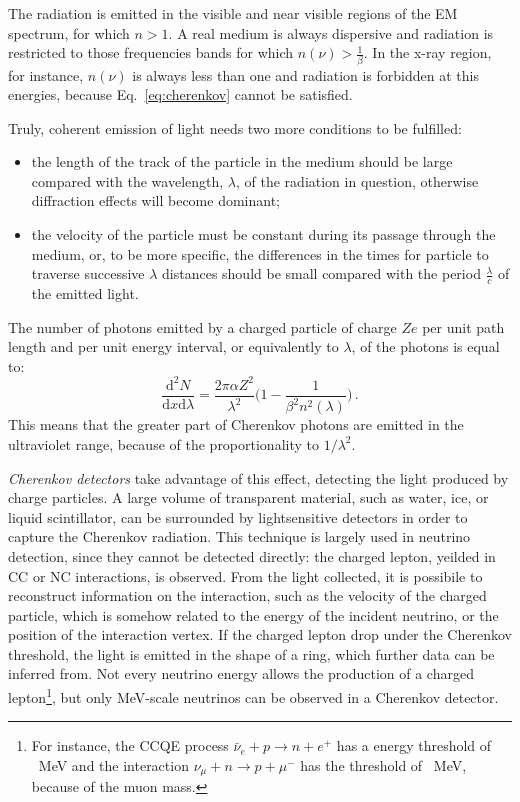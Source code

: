 The radiation is emitted in the visible and near visible regions of the EM spectrum, for which $ n > 1$.
A real medium is always dispersive and radiation is restricted to those frequencies bands for which %
$n(\nu) > \frac{1}{\beta}$.
In the x-ray region, for instance, $n(\nu)$ is always less than one and radiation is forbidden at this energies, %
because Eq.~\ref{eq:cherenkov} cannot be satisfied.

Truly, coherent emission of light needs two more conditions to be fulfilled:
\begin{itemize}
	\item the length of the track of the particle in the medium should be large compared with the wavelength, %
		$\lambda$, of the radiation in question, otherwise diffraction effects will become dominant;
	\item the velocity of the particle must be constant during its passage through the medium, or, %
		to be more specific, the differences in the times for particle to traverse successive $\lambda$ distances %
		should be small compared with the period $\frac{\lambda}{c}$ of the emitted light.
\end{itemize}

The number of photons emitted by a charged particle of charge $Ze$ per unit path length and per unit %
energy interval, or equivalently to $\lambda$, of the photons is equal to:
\begin{equation}
	\label{eq:ch_ph}
	\frac{\mathrm{d}^2N}{\mathrm{d}x\mathrm{d}\lambda} = \frac{2\pi\alpha Z^2}{\lambda^2} %
	\bigg(1-\frac{1}{\beta^2 n^2(\lambda)} \bigg)\,.
\end{equation}
This means that the greater part of Cherenkov photons are emitted in the ultraviolet range, because of the %
proportionality to $1/\lambda^2$.

\emph{Cherenkov detectors} take advantage of this effect, detecting the light produced by charge particles.
A large volume of transparent material, such as water, ice, or liquid scintillator, can be %
surrounded by lightsensitive detectors in order to capture the Cherenkov radiation.
This technique is largely used in neutrino detection, since they cannot be detected directly: the charged lepton, %
yeilded in CC or NC interactions, is observed.
From the light collected, it is possibile to reconstruct information on the interaction, such as the velocity %
of the charged particle, which is somehow related to the energy of the incident neutrino, or the position %
of the interaction vertex.
If the charged lepton drop under the Cherenkov threshold, the light is emitted in the shape of a ring, which %
further data can be inferred from.
Not every neutrino energy allows the production of a charged lepton\footnote{For instance, the CCQE process %
	$\bar\nu_e+p\rightarrow n+e^+$ has a energy threshold of ~MeV and the interaction %
	$\nu_\mu+n\rightarrow p+\mu^-$ has the threshold of ~MeV, because of the muon mass.}, %
but only MeV-scale neutrinos can be observed in a Cherenkov detector.


